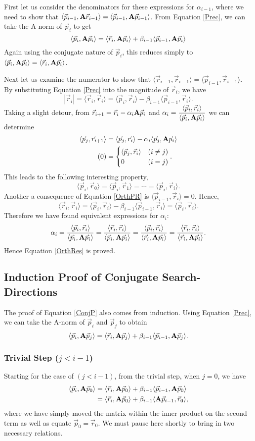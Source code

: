 \documentclass[11pt,letterpaper,oneside,notitlepage]{article}	%
\newcommand{\bfa}{{\bf A}}						%
\newcommand{\ip}[2]{\langle \vec #1,\vec #2 \rangle}	%
\newcommand{\aip}[2]{\langle \vec #1,\bfa\vec #2 \rangle}	%
\newcommand{\yestag}{\tag{\theequation}\stepcounter{equation}}	%
\newcommand{\eq}[1]{Equation \eqref{#1}}		%
\newcommand{\pindent}[1]{\hspace{6mm}}  		%
\numberwithin{equation}{section}				%
\begin{document}
First let us consider the denominators for these expressions for $\alpha_{i-1}$, where we need to show that $\aip{p_{i-1}}{r_{i-1}} = \aip{p_{i-1}}{p_{i-1}}$. From \eq{Prec}, we can take the A-norm of $\vec p_i$ to get
\[
\aip{p_i}{p_i} = \aip{r_i}{p_i} + \beta_{i-1} \aip{p_{i-1}}{p_i}
\]
Again using the conjugate nature of $\vec p_i$, this reduces simply to $\aip{p_i}{p_i} = \aip{r_i}{p_i}$. 

Next let us examine the numerator to show that $\ip{r_{i-1}}{r_{i-1}} = \ip{p_{i-1}}{r_{i-1}}$. By substituting \eq{Prec} into the magnitude of $\vec r_i$, we have 
\[
|\vec r_i| = \ip{r_i}{r_i} = \ip{p_i}{r_i}  - \beta_{i-1}\ip{p_{i-1}}{r_i}
.\]
Taking a slight detour, from $\vec r_{i+1} = \vec r_i-\alpha_i \bfa \vec p_i$ and $\alpha_i = \dfrac{\ip{p_i}{r_i}}{\aip{p_i}{p_i}}$ we can determine
\begin{align*}
\ip{p_j}{r_{i+1}} &= \ip{p_j}{r_i} - \alpha_i \aip{p_j}{p_i} \\ \yestag \label{OrthPR}
&=
\begin{cases}
\ip{p_j}{r_i}   & (i\neq j) \\
0 & (i = j)
\end{cases}.
\end{align*}
This leads to the following interesting property,
\[
\ip{p_i}{r_0} = \ip{ p_i}{r_1} = \cdots = \ip{p_i}{r_i}
.\]
Another a consequence of \eq{OrthPR} is $\ip{p_{i-1}}{r_i} = 0$. Hence, 
\[
\ip{r_i}{r_i} = \ip{p_i}{r_i}  - \beta_{i-1}\ip{p_{i-1}}{r_i} = \ip{p_i}{r_i}
.\]
Therefore we have found equivalent expressions for $\alpha_i$:
\begin{equation}
\alpha_i = \dfrac{\ip{p_i}{r_i}}{\aip{p_i}{p_i}}=\dfrac{\ip{r_i}{r_i}}{\aip{p_i}{p_i}}=\dfrac{\ip{p_i}{r_i}}{\aip{r_i}{p_i}}=\dfrac{\ip{r_i}{r_i}}{\aip{r_i}{p_i}} \label{AlphaOptions}
.\end{equation}
Hence \eq{OrthRes} is proved.

\subsection{Induction Proof of Conjugate Search-Directions}%
\pindent{}The proof of \eq{ConjP} also comes from induction. Using \eq{Prec}, we can take the A-norm of $\vec p_i$ and $\vec p_j$ to obtain
\[
\aip{p_i}{p_j} = \aip{r_i}{p_j} + \beta_{i-1}\aip{p_{i-1}}{p_j}
.\]

\subsubsection{Trivial Step ($j<i-1$)}%
\pindent{}Starting for the case of $(j<i-1)$, from the trivial step, when $j=0$, we have
\begin{align*}
\aip{p_i}{p_0} &= \aip{r_i}{p_0} + \beta_{i-1}\aip{p_{i-1}}{p_0} \\
&= \aip{r_i}{p_0} + \beta_{i-1}\langle \bfa\vec p_{i-1},\vec r_0\rangle 
,\end{align*}
where we have simply moved the matrix within the inner product on the second term as well as  equate $\vec p_0 = \vec r_0$. We must pause here shortly to bring in two necessary relations.
\end{document}
